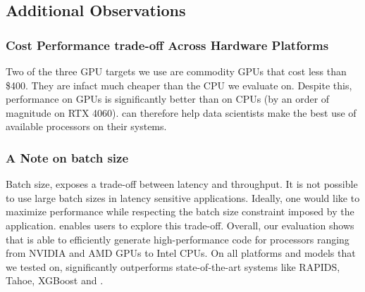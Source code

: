 \subsection{Additional Observations}
\subsubsection*{Cost Performance trade-off Across Hardware Platforms}
Two of the three GPU targets we use are commodity GPUs that cost less than \$400. They 
are infact much cheaper than the CPU we evaluate on. Despite this, performance on GPUs
is significantly better than on CPUs (by an order of magnitude on RTX 4060).
\Treebeard{} can therefore help data scientists make the best use of 
available processors on their systems.

\subsubsection*{A Note on batch size}
Batch size, exposes a trade-off between latency and throughput. It is not possible to use 
large batch sizes in latency sensitive applications. 
Ideally, one would like 
to maximize performance while respecting the batch size constraint imposed 
by the application. \Treebeard{} enables users to explore this trade-off.  
\bigbreak
\noindent
Overall, our evaluation shows that \Treebeard{} is able to efficiently generate 
high-performance code for processors ranging from NVIDIA and AMD GPUs to Intel CPUs.
On all platforms and models that we tested on, \Treebeard{} significantly outperforms
state-of-the-art systems like RAPIDS, Tahoe, XGBoost and \TreebeardOLD{}.